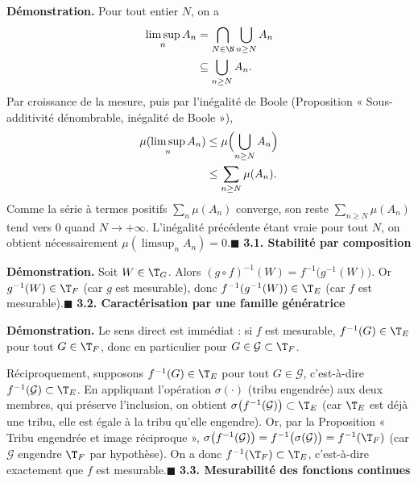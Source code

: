 
\textbf{Démonstration.} Pour tout entier $N$, on a
\[
\begin{aligned}
\limsup_n A_n&=\bigcap_{N\in\N}\bigcup_{n\ge N}A_n\\
&\subseteq\bigcup_{n\ge N}A_n.
\end{aligned}
\]
Par croissance de la mesure, puis par l’inégalité de Boole (Proposition « Sous-additivité dénombrable, inégalité de Boole »),
\[
\begin{aligned}
\mu(\limsup_n A_n)&\le\mu\Bigl(\bigcup_{n\ge N}A_n\Bigr)\\
&\le\sum_{n\ge N}\mu(A_n).
\end{aligned}
\]
Comme la série à termes positifs $\sum_n\mu(A_n)$ converge, son reste $\sum_{n\ge N}\mu(A_n)$ tend vers $0$ quand $N\to+\infty$. L’inégalité précédente étant vraie pour tout $N$, on obtient nécessairement $\mu(\limsup_n A_n)=0$.\hfill$\blacksquare$
\textbf{3.1. Stabilité par composition}


\textbf{Démonstration.} Soit $W\in\T_G$. Alors $(g\circ f)^{-1}(W)=f^{-1}\bigl(g^{-1}(W)\bigr)$. Or $g^{-1}(W)\in\T_F$ (car $g$ est mesurable), donc $f^{-1}(g^{-1}(W))\in\T_E$ (car $f$ est mesurable).\hfill$\blacksquare$
\textbf{3.2. Caractérisation par une famille génératrice}


\textbf{Démonstration.} Le sens direct est immédiat : si $f$ est mesurable, $f^{-1}(G)\in\T_E$ pour tout $G\in\T_F$, donc en particulier pour $G\in\mathcal G\subset\T_F$.

Réciproquement, supposons $f^{-1}(G)\in\T_E$ pour tout $G\in\mathcal G$, c’est-à-dire $f^{-1}(\mathcal G)\subset\T_E$. En appliquant l’opération $\sigma(\cdot)$ (tribu engendrée) aux deux membres, qui préserve l’inclusion, on obtient $\sigma\bigl(f^{-1}(\mathcal G)\bigr)\subset\T_E$ (car $\T_E$ est déjà une tribu, elle est égale à la tribu qu’elle engendre). Or, par la Proposition « Tribu engendrée et image réciproque », $\sigma\bigl(f^{-1}(\mathcal G)\bigr)=f^{-1}\bigl(\sigma(\mathcal G)\bigr)=f^{-1}(\T_F)$ (car $\mathcal G$ engendre $\T_F$ par hypothèse). On a donc $f^{-1}(\T_F)\subset\T_E$, c’est-à-dire exactement que $f$ est mesurable.\hfill$\blacksquare$
\textbf{3.3. Mesurabilité des fonctions continues}

